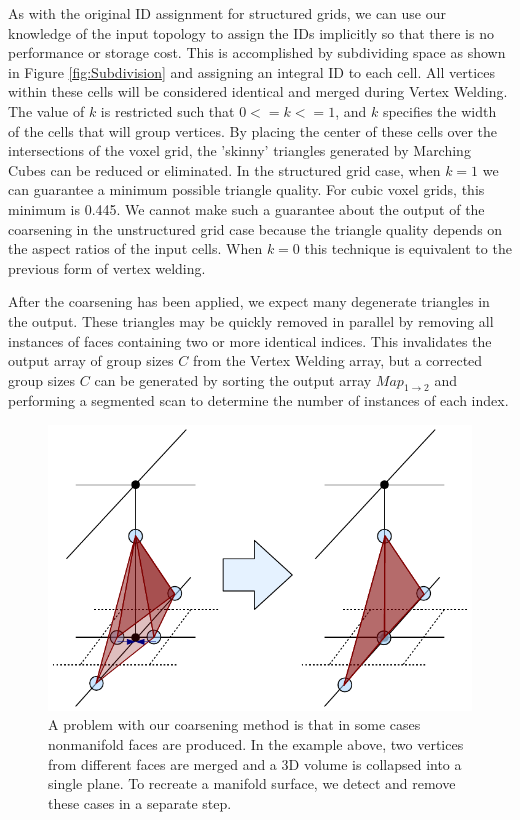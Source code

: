 \documentclass[journal]{vgtc}                %
\begin{document}
As with the original ID assignment for structured grids, we can use our knowledge of the input topology to assign the IDs implicitly so that there is no performance or storage cost. This is accomplished by subdividing space as shown in Figure \ref{fig:Subdivision} and assigning an integral ID to each cell. All vertices within these cells will be considered identical and merged during Vertex Welding. The value of $k$ is restricted such that $0<=k<=1$, and $k$ specifies the width of the cells that will group vertices. By placing the center of these cells over the intersections of the voxel grid, the 'skinny' triangles generated by Marching Cubes can be reduced or eliminated. In the structured grid case, when $k=1$ we can guarantee a minimum possible triangle quality. For cubic voxel grids, this minimum is 0.445. We cannot make such a guarantee about the output of the coarsening in the unstructured grid case because the triangle quality depends on the aspect ratios of the input cells. When $k=0$ this technique is equivalent to the previous form of vertex welding.  

After the coarsening has been applied, we expect many degenerate triangles in the output. These triangles may be quickly removed in parallel by removing
all instances of faces containing two or more identical indices. This invalidates the output array of group sizes $C$ from the Vertex Welding array, but a corrected group sizes $C$ can be generated by sorting the output array $Map_{1\rightarrow 2}$ and performing a segmented scan to determine the number of instances of each index.

\begin{figure}[!ht]
\includegraphics[width=\columnwidth]{Nonmanifold}
\caption{A problem with our coarsening method is that in some cases nonmanifold faces are produced. In the example above, two vertices from different faces are merged and a 3D volume is collapsed into a single plane. To recreate a manifold surface, we detect and remove these cases in a separate step.}
\label{fig:Nonmanifold}
\end{figure}
\end{document}

